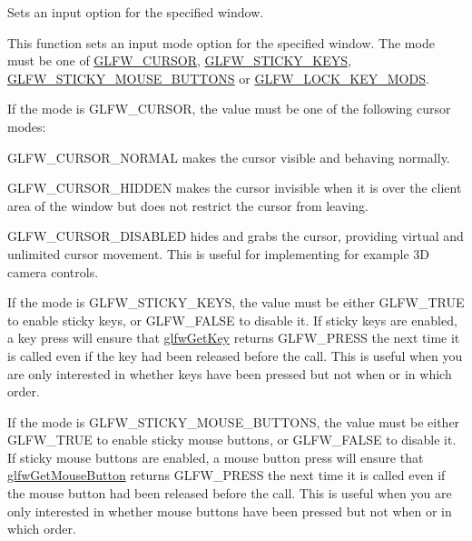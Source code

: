 Sets an input option for the specified window. 

This function sets an input mode option for the specified window. The mode must be one of \mbox{\hyperlink{glfw3_8h_aade31da5b884a84a7625c6b059b9132c}{G\+L\+F\+W\+\_\+\+C\+U\+R\+S\+OR}}, \mbox{\hyperlink{glfw3_8h_ae3bbe2315b7691ab088159eb6c9110fc}{G\+L\+F\+W\+\_\+\+S\+T\+I\+C\+K\+Y\+\_\+\+K\+E\+YS}}, \mbox{\hyperlink{glfw3_8h_a4d7ce8ce71030c3b04e2b78145bc59d1}{G\+L\+F\+W\+\_\+\+S\+T\+I\+C\+K\+Y\+\_\+\+M\+O\+U\+S\+E\+\_\+\+B\+U\+T\+T\+O\+NS}} or \mbox{\hyperlink{glfw3_8h_a07b84de0b52143e1958f88a7d9105947}{G\+L\+F\+W\+\_\+\+L\+O\+C\+K\+\_\+\+K\+E\+Y\+\_\+\+M\+O\+DS}}.

If the mode is {\ttfamily G\+L\+F\+W\+\_\+\+C\+U\+R\+S\+OR}, the value must be one of the following cursor modes\+:
\begin{DoxyItemize}
\item {\ttfamily G\+L\+F\+W\+\_\+\+C\+U\+R\+S\+O\+R\+\_\+\+N\+O\+R\+M\+AL} makes the cursor visible and behaving normally.
\item {\ttfamily G\+L\+F\+W\+\_\+\+C\+U\+R\+S\+O\+R\+\_\+\+H\+I\+D\+D\+EN} makes the cursor invisible when it is over the client area of the window but does not restrict the cursor from leaving.
\item {\ttfamily G\+L\+F\+W\+\_\+\+C\+U\+R\+S\+O\+R\+\_\+\+D\+I\+S\+A\+B\+L\+ED} hides and grabs the cursor, providing virtual and unlimited cursor movement. This is useful for implementing for example 3D camera controls.
\end{DoxyItemize}

If the mode is {\ttfamily G\+L\+F\+W\+\_\+\+S\+T\+I\+C\+K\+Y\+\_\+\+K\+E\+YS}, the value must be either {\ttfamily G\+L\+F\+W\+\_\+\+T\+R\+UE} to enable sticky keys, or {\ttfamily G\+L\+F\+W\+\_\+\+F\+A\+L\+SE} to disable it. If sticky keys are enabled, a key press will ensure that \mbox{\hyperlink{group__input_ga7d8ad8ffaf272808f04e1d5d33ec8859}{glfw\+Get\+Key}} returns {\ttfamily G\+L\+F\+W\+\_\+\+P\+R\+E\+SS} the next time it is called even if the key had been released before the call. This is useful when you are only interested in whether keys have been pressed but not when or in which order.

If the mode is {\ttfamily G\+L\+F\+W\+\_\+\+S\+T\+I\+C\+K\+Y\+\_\+\+M\+O\+U\+S\+E\+\_\+\+B\+U\+T\+T\+O\+NS}, the value must be either {\ttfamily G\+L\+F\+W\+\_\+\+T\+R\+UE} to enable sticky mouse buttons, or {\ttfamily G\+L\+F\+W\+\_\+\+F\+A\+L\+SE} to disable it. If sticky mouse buttons are enabled, a mouse button press will ensure that \mbox{\hyperlink{group__input_ga6da5efb04f700c312a57a169fa9393a0}{glfw\+Get\+Mouse\+Button}} returns {\ttfamily G\+L\+F\+W\+\_\+\+P\+R\+E\+SS} the next time it is called even if the mouse button had been released before the call. This is useful when you are only interested in whether mouse buttons have been pressed but not when or in which order.

